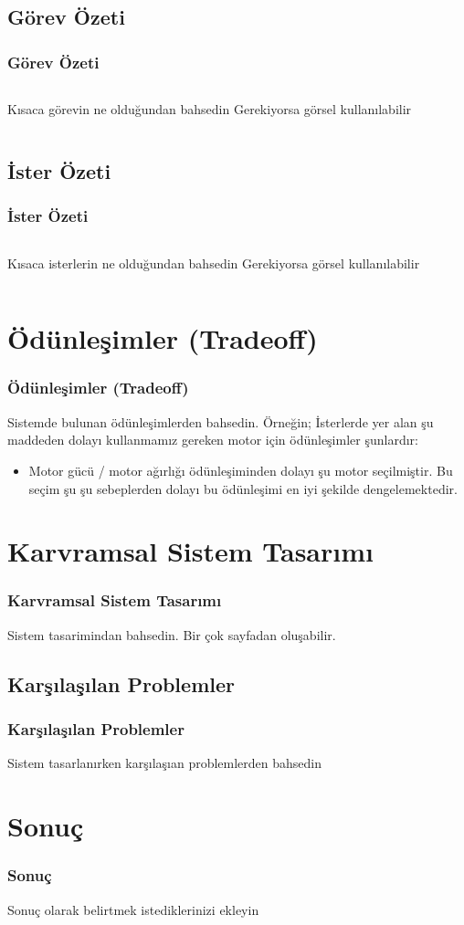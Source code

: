 \documentclass{beamer}
\begin{document}
\subsection[Görev Özeti]{Görev Özeti}
\begin{frame}
\frametitle{Görev Özeti}
    \begin{columns}[c]
        \column{2in}
        Kısaca görevin ne olduğundan bahsedin
        \column{2in}
        Gerekiyorsa görsel kullanılabilir
    \end{columns}
\end{frame}

\subsection[İster Özeti]{İster Özeti}
\begin{frame}
\frametitle{İster Özeti}
    \begin{columns}[c]
        \column{2in}
        Kısaca isterlerin ne olduğundan bahsedin
        \column{2in}
        Gerekiyorsa görsel kullanılabilir
    \end{columns}
\end{frame}

\section{Ödünleşimler (Tradeoff)}
\begin{frame}[fragile]
    \frametitle{Ödünleşimler (Tradeoff)}
    Sistemde bulunan ödünleşimlerden bahsedin. 
    Örneğin;
    İsterlerde yer alan şu maddeden dolayı kullanmamız gereken motor için ödünleşimler şunlardır:
    \begin{itemize}
        \item
        Motor gücü / motor ağırlığı ödünleşiminden dolayı şu motor seçilmiştir. 
        Bu seçim şu şu sebeplerden dolayı bu ödünleşimi en iyi şekilde dengelemektedir.
    \end{itemize}
\end{frame}

\section{Karvramsal Sistem Tasarımı}
\begin{frame}
\frametitle{Karvramsal Sistem Tasarımı}
Sistem tasarimindan bahsedin. Bir çok sayfadan oluşabilir.
\end{frame}

\subsection[Karşılaşılan Problemler]{Karşılaşılan Problemler}
\begin{frame}
\frametitle{Karşılaşılan Problemler}
Sistem tasarlanırken karşılaşıan problemlerden bahsedin
\end{frame}

\section{Sonuç}
\begin{frame}
\frametitle{Sonuç}
Sonuç olarak belirtmek istediklerinizi ekleyin
\end{frame}
\end{document}

